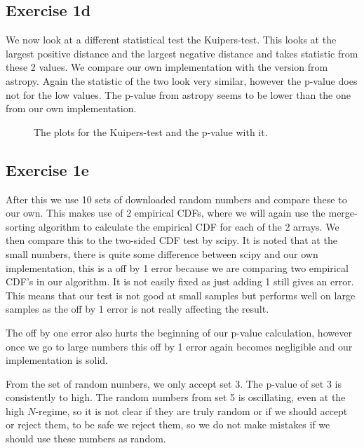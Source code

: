   \subsection{Exercise 1d}
  
  We now look at a different statistical test the Kuipers-test. This looks at the largest positive distance and the largest negative distance and takes statistic from these 2 values. We compare our own implementation with the version from astropy. Again the statistic of the two look very similar, however the p-value does not for the low values. The p-value from astropy seems to be lower than the one from our own implementation.
  
  \begin{figure}
    \centering
    \qquad
    \caption{The plots for the Kuipers-test and the p-value with it.}
    \label{fig:example}%
 
  \end{figure}


\subsection{Exercise 1e}
After this we use 10 sets of downloaded random numbers and compare these to our own. This makes use of 2 empirical CDFs, where we will again use the merge-sorting algorithm to calculate the empirical CDF for each of the 2 arrays. We then compare this to the two-sided CDF test by scipy. It is noted that at the small numbers, there is quite some difference between scipy and our own implementation, this is a off by 1 error because we are comparing two empirical CDF's in our algorithm. It is not easily fixed as just adding 1 still gives an error. This means that our test is not good at small samples but performs well on large samples as the off by 1 error is not really affecting the result.

The off by one error also hurts the beginning of our p-value calculation, however once we go to large numbers this off by 1 error again becomes negligible and our implementation is solid.

From the set of random numbers, we only accept set 3. The p-value of set 3 is consistently to high. The random numbers from set 5 is oscillating, even at the high $N$-regime, so it is not clear if they are truly random or if we should accept or reject them, to be safe we reject them, so we do not make mistakes if we should use these numbers as random.


